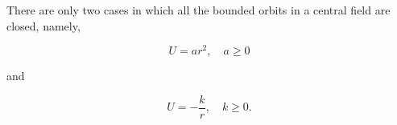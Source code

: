 There are only two cases in which all the bounded orbits in a central field are closed, namely,

$$U = ar^2, \quad a \geq 0$$

and

$$U = -\frac{k}{r}, \quad k \geq 0.$$
